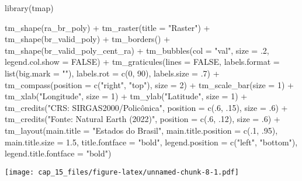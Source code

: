 \documentclass[
]{book}
\newenvironment{Shaded}{\begin{snugshade}}{\end{snugshade}}
\newcommand{\AttributeTok}[1]{\textcolor[rgb]{0.77,0.63,0.00}{#1}}
\newcommand{\ConstantTok}[1]{\textcolor[rgb]{0.00,0.00,0.00}{#1}}
\newcommand{\DecValTok}[1]{\textcolor[rgb]{0.00,0.00,0.81}{#1}}
\newcommand{\FloatTok}[1]{\textcolor[rgb]{0.00,0.00,0.81}{#1}}
\newcommand{\FunctionTok}[1]{\textcolor[rgb]{0.00,0.00,0.00}{#1}}
\newcommand{\NormalTok}[1]{#1}
\newcommand{\SpecialCharTok}[1]{\textcolor[rgb]{0.00,0.00,0.00}{#1}}
\newcommand{\StringTok}[1]{\textcolor[rgb]{0.31,0.60,0.02}{#1}}
\begin{document}
\begin{Shaded}
\begin{Highlighting}[]
\FunctionTok{library}\NormalTok{(tmap)}

\FunctionTok{tm\_shape}\NormalTok{(ra\_br\_poly) }\SpecialCharTok{+}
    \FunctionTok{tm\_raster}\NormalTok{(}\AttributeTok{title =} \StringTok{"Raster"}\NormalTok{) }\SpecialCharTok{+}
    \FunctionTok{tm\_shape}\NormalTok{(br\_valid\_poly) }\SpecialCharTok{+}
    \FunctionTok{tm\_borders}\NormalTok{() }\SpecialCharTok{+}
    \FunctionTok{tm\_shape}\NormalTok{(br\_valid\_poly\_cent\_ra) }\SpecialCharTok{+}
    \FunctionTok{tm\_bubbles}\NormalTok{(}\AttributeTok{col =} \StringTok{"val"}\NormalTok{, }\AttributeTok{size =}\NormalTok{ .}\DecValTok{2}\NormalTok{, }\AttributeTok{legend.col.show =} \ConstantTok{FALSE}\NormalTok{) }\SpecialCharTok{+}
    \FunctionTok{tm\_graticules}\NormalTok{(}\AttributeTok{lines =} \ConstantTok{FALSE}\NormalTok{, }
                  \AttributeTok{labels.format =} \FunctionTok{list}\NormalTok{(}\AttributeTok{big.mark =} \StringTok{""}\NormalTok{), }
                  \AttributeTok{labels.rot =} \FunctionTok{c}\NormalTok{(}\DecValTok{0}\NormalTok{, }\DecValTok{90}\NormalTok{),}
                  \AttributeTok{labels.size =}\NormalTok{ .}\DecValTok{7}\NormalTok{) }\SpecialCharTok{+}
    \FunctionTok{tm\_compass}\NormalTok{(}\AttributeTok{position =} \FunctionTok{c}\NormalTok{(}\StringTok{"right"}\NormalTok{, }\StringTok{"top"}\NormalTok{), }\AttributeTok{size =} \DecValTok{2}\NormalTok{) }\SpecialCharTok{+}
    \FunctionTok{tm\_scale\_bar}\NormalTok{(}\AttributeTok{size =} \DecValTok{1}\NormalTok{) }\SpecialCharTok{+}
    \FunctionTok{tm\_xlab}\NormalTok{(}\StringTok{"Longitude"}\NormalTok{, }\AttributeTok{size =} \DecValTok{1}\NormalTok{) }\SpecialCharTok{+}
    \FunctionTok{tm\_ylab}\NormalTok{(}\StringTok{"Latitude"}\NormalTok{, }\AttributeTok{size =} \DecValTok{1}\NormalTok{) }\SpecialCharTok{+}
    \FunctionTok{tm\_credits}\NormalTok{(}\StringTok{"CRS: SIRGAS2000/Policônica"}\NormalTok{, }\AttributeTok{position =} \FunctionTok{c}\NormalTok{(.}\DecValTok{6}\NormalTok{, .}\DecValTok{15}\NormalTok{), }\AttributeTok{size =}\NormalTok{ .}\DecValTok{6}\NormalTok{) }\SpecialCharTok{+}
    \FunctionTok{tm\_credits}\NormalTok{(}\StringTok{"Fonte: Natural Earth (2022)"}\NormalTok{, }\AttributeTok{position =} \FunctionTok{c}\NormalTok{(.}\DecValTok{6}\NormalTok{, .}\DecValTok{12}\NormalTok{), }\AttributeTok{size =}\NormalTok{ .}\DecValTok{6}\NormalTok{) }\SpecialCharTok{+}
    \FunctionTok{tm\_layout}\NormalTok{(}\AttributeTok{main.title =} \StringTok{"Estados do Brasil"}\NormalTok{,}
              \AttributeTok{main.title.position =} \FunctionTok{c}\NormalTok{(.}\DecValTok{1}\NormalTok{, .}\DecValTok{95}\NormalTok{),}
              \AttributeTok{main.title.size =} \FloatTok{1.5}\NormalTok{,}
              \AttributeTok{title.fontface =} \StringTok{"bold"}\NormalTok{,}
              \AttributeTok{legend.position =} \FunctionTok{c}\NormalTok{(}\StringTok{"left"}\NormalTok{, }\StringTok{"bottom"}\NormalTok{),}
              \AttributeTok{legend.title.fontface =} \StringTok{"bold"}\NormalTok{)}
\end{Highlighting}
\end{Shaded}

\texttt{[image: cap\_15\_files/figure-latex/unnamed-chunk-8-1.pdf]}

  
\end{document}
